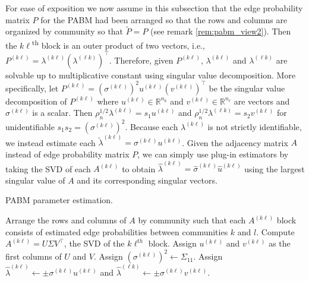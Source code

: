 \documentclass[
  12pt,
]{article}
\theoremstyle{definition}
\theoremstyle{definition}
\theoremstyle{definition}
\theoremstyle{definition}
\theoremstyle{remark}
\begin{document}
For ease of exposition we now assume in this subsection that the edge probability matrix \(P\) for the PABM had been arranged so that the rows and columns are organized by community so that \(\tilde{P} = P\) (see remark \ref{rem:pabm_view2}).
Then the \(k\ell\)\textsuperscript{th} block is an outer product of two vectors, i.e., \(P^{(k \ell)} = \lambda^{(k \ell)} (\lambda^{(\ell k)})^\top\).
Therefore, given \(P^{(k \ell)}\), \(\lambda^{(k \ell)}\) and \(\lambda^{(\ell k)}\) are solvable up to multiplicative constant using singular value decomposition.
More specifically, let \(P^{(k \ell)} = (\sigma^{(k \ell)})^2 u^{(k \ell)} (v^{(k \ell)})^\top\) be the singular value decomposition of \(P^{(k \ell)}\) where \(u^{(k \ell)} \in \mathbb{R}^{n_k}\) and \(v^{(k \ell)} \in \mathbb{R}^{n_\ell}\) are vectors and \(\sigma^{(k \ell)}\) is a scalar.
Then \(\rho_n^{1/2} \lambda^{(k \ell)} = s_1 u^{(k \ell)}\) and \(\rho_n^{1/2} \lambda^{(\ell k)} = s_2 v^{(k \ell)}\) for unidentifiable \(s_1 s_2 = (\sigma^{(k \ell)})^2\).
Because each \(\lambda^{(k \ell)}\) is not strictly identifiable, we instead estimate each \(\tilde{\lambda}^{(k \ell)} = \sigma^{(k \ell)} u^{(k \ell)}\).
Given the adjacency matrix \(A\) instead of edge probability matrix \(P\), we can simply use plug-in estimators by taking the SVD of each \(A^{(k \ell)}\) to obtain \(\hat{\lambda}^{(k \ell)} = \hat{\sigma}^{(k \ell)} \hat{u}^{(k \ell)}\) using the largest singular value of \(A\) and its corresponding singular vectors.

\begin{algorithm}[tp]
\label{alg:param_est}
\DontPrintSemicolon
\SetAlgoLined
{}
\caption{PABM parameter estimation.}
Arrange the rows and columns of $A$ by community such that each 
$A^{(k \ell)}$ block consists of estimated edge probabilities between 
communities $k$ and $l$.\;
 {
Compute $A^{(k \ell)} = U \Sigma V^\top$, the SVD of the $k\ell^{th}$ block.\;
Assign $u^{(k \ell)}$ and $v^{(k \ell)}$ as the first columns of $U$ and $V$. 
Assign $(\sigma^{(k \ell)})^2 \leftarrow \Sigma_{11}$.\;
Assign $\hat{\lambda}^{(k \ell)} \leftarrow \pm \sigma^{(k \ell)} u^{(k \ell)}$ and $\hat{\lambda}^{(\ell k)} \leftarrow \pm \sigma^{(k \ell)} v^{(k \ell)}$.
}
\end{algorithm}
\end{document}
